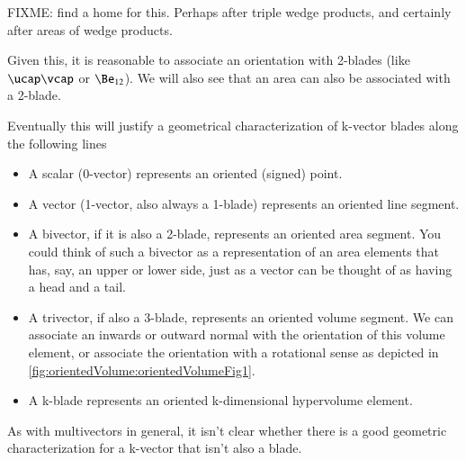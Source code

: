 %
%
FIXME: find a home for this.
Perhaps after triple wedge products, and certainly after areas of wedge products.

Given this, it is reasonable to associate an orientation with 2-blades (like \( \ucap \vcap \) or \( \Be_{12} \)).
We will also see that an area can also be associated with a 2-blade.

Eventually this will justify a geometrical characterization of k-vector blades along the following lines

\begin{itemize}
\item A scalar (0-vector) represents an oriented (signed) point.
\item A vector (1-vector, also always a 1-blade) represents an oriented line segment.
\item A bivector, if it is also a 2-blade, represents an oriented area segment.  You could think of such a bivector as a representation of an area elements that has, say, an upper or lower side, just as a vector can be thought of as having a head and a tail.
\item A trivector, if also a 3-blade, represents an oriented volume segment.  We can associate an inwards or outward normal with the orientation of this volume element, or associate the orientation with a rotational sense as depicted in
\cref{fig:orientedVolume:orientedVolumeFig1}.
\item A k-blade represents an oriented k-dimensional hypervolume element.
\end{itemize}

As with multivectors in general, it isn't clear whether there is a good geometric characterization for a k-vector that isn't also a blade.


